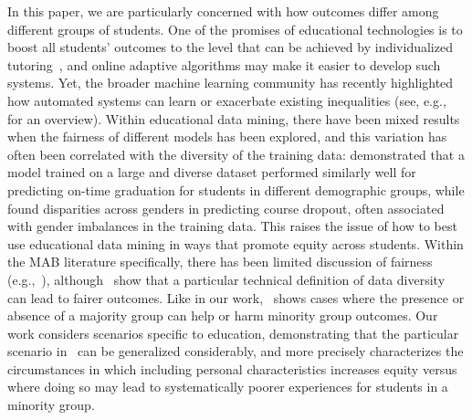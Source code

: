 In this paper, we are particularly concerned with how outcomes differ among different groups of students. One of the promises of educational technologies is to boost all students' outcomes to the level that can be achieved by individualized tutoring~\cite{corbett2001cognitive}, and online adaptive algorithms may make it easier to develop such systems. Yet, the broader machine learning community  has recently highlighted how automated systems can learn or exacerbate existing inequalities (see, e.g.,~\cite{hajian2016algorithmic} for an overview). 
Within educational data mining, there have been mixed results when the fairness of different models has been explored, and this variation has often been correlated with the diversity of the training data: \cite{hutt2019evaluating} demonstrated that a model trained on a large and diverse dataset performed similarly well for predicting on-time graduation for students in different demographic groups, while  \cite{gardner2019evaluating} found disparities across genders in predicting course dropout, often associated with gender imbalances in the training data. This raises the issue of how to best use educational data mining in ways that promote equity across students.
Within the MAB literature specifically, there has been limited discussion of fairness (e.g.,~\cite{joseph2016fairness}), although~\cite{pmlr-v75-raghavan18a} show that a particular technical definition of data diversity can lead to fairer outcomes. Like in our work,~\cite{pmlr-v75-raghavan18a} shows cases where the presence or absence of a majority group can help or harm minority group outcomes. Our work considers scenarios specific to education, demonstrating that the particular scenario in~\cite{pmlr-v75-raghavan18a} can be generalized considerably, and more precisely characterizes the circumstances in which including personal characteristics increases equity versus where doing so may lead to systematically poorer experiences for students in a minority group.




